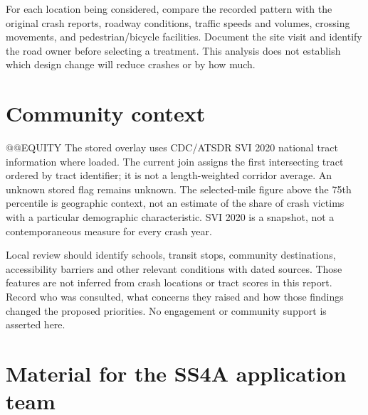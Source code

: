 \documentclass[10pt,letterpaper]{article}
\begin{document}
For each location being considered, compare the recorded pattern with the original
crash reports, roadway conditions, traffic speeds and volumes, crossing movements,
and pedestrian/bicycle facilities. Document the site visit and identify the road
owner before selecting a treatment. This analysis does not establish which design
change will reduce crashes or by how much.

\clearpage
\section{Community context}
@@EQUITY
The stored overlay uses CDC/ATSDR SVI 2020 national tract information where loaded.
The current join assigns the first intersecting tract ordered by tract identifier;
it is not a length-weighted corridor average. An unknown stored flag remains unknown.
The selected-mile figure above the 75th percentile is geographic context, not an
estimate of the share of crash victims with a particular demographic characteristic.
SVI 2020 is a snapshot, not a contemporaneous measure for every crash year.

Local review should identify schools, transit stops, community destinations,
accessibility barriers and other relevant conditions with dated sources. Those
features are not inferred from crash locations or tract scores in this report.
Record who was consulted, what concerns they raised and how those findings changed
the proposed priorities. No engagement or community support is asserted here.

\clearpage
\section{Material for the SS4A application team}
\end{document}
